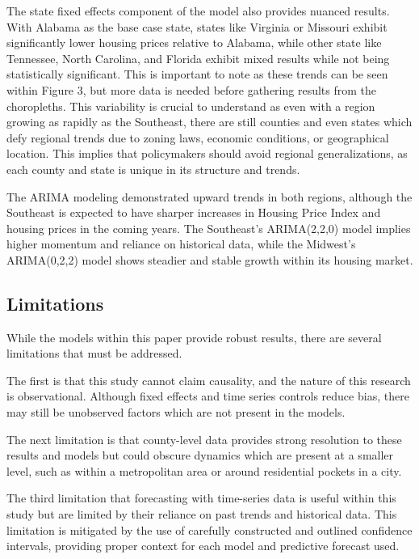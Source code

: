 \documentclass[journal,article,submit,pdftex,moreauthors]{Definitions/mdpi}
\begin{document}
The state fixed effects component of the model also provides nuanced results. With Alabama as the base case state, states like Virginia or Missouri exhibit significantly lower housing prices relative to Alabama, while other state like Tennessee, North Carolina, and Florida exhibit mixed results while not being statistically significant. This is important to note as these trends can be seen within Figure 3, but more data is needed before gathering results from the choropleths. This variability is crucial to understand as even with a region growing as rapidly as the Southeast, there are still counties and even states which defy regional trends due to zoning laws, economic conditions, or geographical location. This implies that policymakers should avoid regional generalizations, as each county and state is unique in its structure and trends.
 
The ARIMA modeling demonstrated upward trends in both regions, although the Southeast is expected to have sharper increases in Housing Price Index and housing prices in the coming years. The Southeast’s ARIMA(2,2,0) model implies higher momentum and reliance on historical data, while the Midwest’s ARIMA(0,2,2) model shows steadier and stable growth within its housing market.


\subsection{Limitations}

While the models within this paper provide robust results, there are several limitations that must be addressed.
 
The first is that this study cannot claim causality, and the nature of this research is observational. Although fixed effects and time series controls reduce bias, there may still be unobserved factors which are not present in the models.
 
The next limitation is that county-level data provides strong resolution to these results and models but could obscure dynamics which are present at a smaller level, such as within a metropolitan area or around residential pockets in a city.
 
The third limitation that forecasting with time-series data is useful within this study but are limited by their reliance on past trends and historical data. This limitation is mitigated by the use of carefully constructed and outlined confidence intervals, providing proper context for each model and predictive forecast used.
\end{document}
